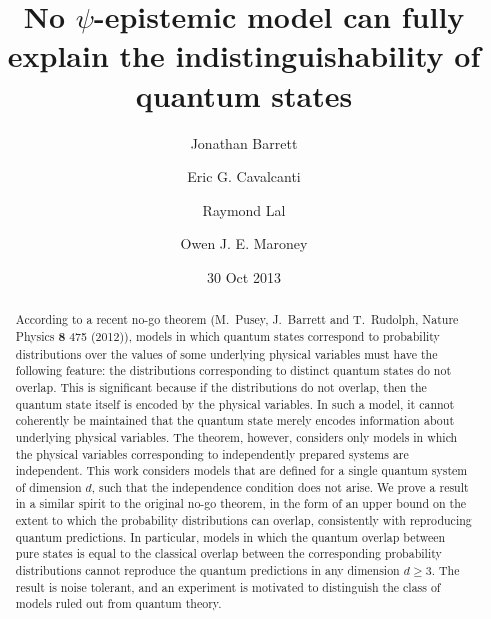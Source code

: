 \documentclass[prl,onecolumn,superscriptaddress,12pt]{revtex4-2}
\theoremstyle{remark}
\theoremstyle{definition}
\begin{document}
\title{No $\psi$-epistemic model can fully explain the indistinguishability of quantum states}
\author{Jonathan Barrett}
\author{Eric G. Cavalcanti}
\author{Raymond Lal}
\author{Owen J. E. Maroney}
\date{30 Oct 2013 }

\begin{abstract}

According to a recent no-go theorem (M.~Pusey, J.~Barrett and T.~Rudolph, Nature Physics {\bf 8} 475 (2012)), models in which quantum states correspond to probability distributions over the values of some underlying physical variables must have the following feature: the distributions corresponding to distinct quantum states do not overlap. This is significant because if the distributions do not overlap, then the quantum state itself is encoded by the physical variables. In such a model, it cannot coherently be maintained that the quantum state merely encodes information about underlying physical variables. The theorem, however, considers only models in which the physical variables corresponding to independently prepared systems are independent. This work considers models that are defined for a single quantum system of dimension $d$, such that the independence condition does not arise. We prove a result in a similar spirit to the original no-go theorem, in the form of an upper bound on the extent to which the probability distributions can overlap, consistently with reproducing quantum predictions. In particular, models in which the quantum overlap between pure states is equal to the classical overlap between the corresponding probability distributions cannot reproduce the quantum predictions in any dimension $d \geq 3$. The result is noise tolerant, and an experiment is motivated to distinguish the class of models ruled out from quantum theory.
\end{abstract}
\maketitle

\newpage


%


\newpage

\appendix*


\end{document}
